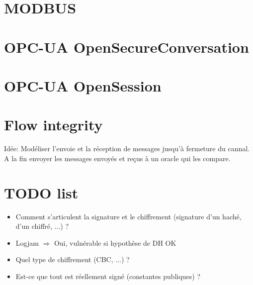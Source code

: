 \documentclass{article}
\newcommand{\opcua}{OPC-UA\xspace}
\begin{document}
\section{MODBUS}

\section{\opcua OpenSecureConversation}


\section{\opcua OpenSession}


\section{Flow integrity}
Idée: Modéliser l'envoie et la réception de messages jusqu'à fermeture du cannal.
A la fin envoyer les messages envoyés et reçus à un oracle qui les compare.

\section{TODO list}

\begin{itemize}
    \item Comment s'articulent la signature et le chiffrement (signature d'un haché, d'un chiffré, ...) ?
    \item Logjam $\Rightarrow$ Oui, vulnérable si hypothèse de DH OK
    \item Quel type de chiffrement (CBC, ...) ?
    \item Est-ce que tout est réellement signé (constantes publiques) ?
\end{itemize}
\end{document}
